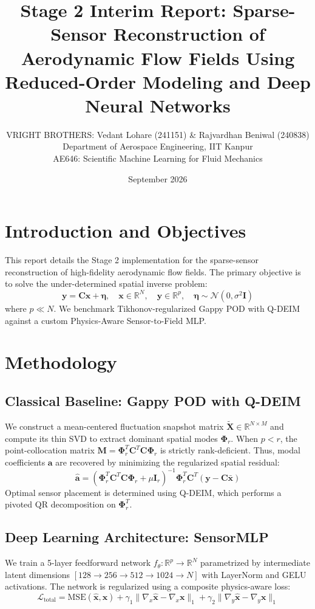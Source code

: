 \documentclass[11pt]{article}
\title{Stage 2 Interim Report: Sparse-Sensor Reconstruction of Aerodynamic Flow Fields Using Reduced-Order Modeling and Deep Neural Networks}
\author{VRIGHT BROTHERS: Vedant Lohare (241151) \& Rajvardhan Beniwal (240838)\\
Department of Aerospace Engineering, IIT Kanpur\\
AE646: Scientific Machine Learning for Fluid Mechanics}
\date{September 2026}
\begin{document}
\maketitle

\section{Introduction and Objectives}
This report details the Stage 2 implementation for the sparse-sensor reconstruction of high-fidelity aerodynamic flow fields. The primary objective is to solve the under-determined spatial inverse problem:
\begin{equation}
\mathbf{y} = \mathbf{C}\mathbf{x} + \boldsymbol{\eta}, \quad \mathbf{x} \in \mathbb{R}^N, \quad \mathbf{y} \in \mathbb{R}^p, \quad \boldsymbol{\eta} \sim \mathcal{N}(0, \sigma^2 \mathbf{I})
\end{equation}
where $p \ll N$. We benchmark Tikhonov-regularized Gappy POD with Q-DEIM against a custom Physics-Aware Sensor-to-Field MLP.

\section{Methodology}
\subsection{Classical Baseline: Gappy POD with Q-DEIM}
We construct a mean-centered fluctuation snapshot matrix $\tilde{\mathbf{X}} \in \mathbb{R}^{N \times M}$ and compute its thin SVD to extract dominant spatial modes $\boldsymbol{\Phi}_r$. When $p < r$, the point-collocation matrix $\mathbf{M} = \boldsymbol{\Phi}_r^T \mathbf{C}^T \mathbf{C} \boldsymbol{\Phi}_r$ is strictly rank-deficient. Thus, modal coefficients $\mathbf{a}$ are recovered by minimizing the regularized spatial residual:
\begin{equation}
\hat{\mathbf{a}} = \left( \boldsymbol{\Phi}_r^T \mathbf{C}^T \mathbf{C} \boldsymbol{\Phi}_r + \mu \mathbf{I}_r \right)^{-1} \boldsymbol{\Phi}_r^T \mathbf{C}^T (\mathbf{y} - \mathbf{C}\bar{\mathbf{x}})
\end{equation}
Optimal sensor placement is determined using Q-DEIM, which performs a pivoted QR decomposition on $\boldsymbol{\Phi}_r^T$.

\subsection{Deep Learning Architecture: SensorMLP}
We train a 5-layer feedforward network $f_\theta : \mathbb{R}^p \rightarrow \mathbb{R}^N$ parametrized by intermediate latent dimensions $[128 \rightarrow 256 \rightarrow 512 \rightarrow 1024 \rightarrow N]$ with LayerNorm and GELU activations. The network is regularized using a composite physics-aware loss:
\begin{equation}
\mathcal{L}_{\text{total}} = \text{MSE}(\mathbf{\hat{x}}, \mathbf{x}) + \gamma_1 \|\nabla_x \mathbf{\hat{x}} - \nabla_x \mathbf{x}\|_1 + \gamma_2 \|\nabla_y \mathbf{\hat{x}} - \nabla_y \mathbf{x}\|_1
\end{equation}
\end{document}
